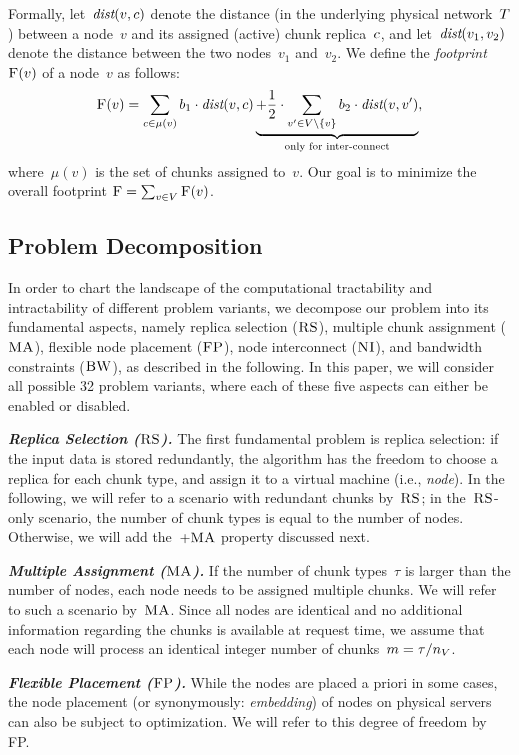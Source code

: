 Formally, let~$\emph{dist}(v,c)$ denote the distance (in the underlying physical network~$T$) between a node~$v$ and
its assigned (active) chunk replica~$c$, and let~$\emph{dist}(v_1,v_2)$ denote the distance between the two nodes~$v_1$ and~$v_2$.
We define the \emph{footprint}~$\textsc{F}(v)$ of a node~$v$ as follows:
$$
\textsc{F}(v) = \sum_{c\in \mu(v)} b_1 \cdot \emph{dist}(v,c) \underbrace{+ \frac{1}{2} \cdot \sum_{v' \in V\setminus\{v\}} b_2 \cdot \emph{dist}(v,v')}_{\text{only for inter-connect}},
$$
 where~$\mu(v)$ is the set of chunks assigned to~$v$. Our goal is to minimize the overall footprint
$\textsc{F}=\sum_{v\in V} \textsc{F}(v)$.

\subsection{Problem Decomposition}

In order to chart the landscape of the computational tractability and intractability of different
problem variants, we decompose our problem into its fundamental aspects, namely replica selection
($\textsc{RS}$), multiple chunk assignment ($\textsc{MA}$), flexible node placement ($\textsc{FP}$), node interconnect ($\textsc{NI}$),
and bandwidth constraints ($\textsc{BW}$), as described in the following. 
In this paper, we will consider all possible 32 problem variants, where each of these five aspects
can either be enabled or disabled. 

\textbf{\emph{Replica Selection ($\textsc{RS}$).}} The first fundamental problem is replica selection:
if the input data is stored redundantly, the algorithm has the freedom to choose a replica
for each chunk type, and assign it to a virtual machine (i.e., \emph{node}).
In the following, we will refer to a scenario
with redundant chunks by~$\textsc{RS}$; in the~$\textsc{RS}$-only scenario, the number of chunk types
is equal to the number of nodes. Otherwise, we will add the~$+\textsc{MA}$ property discussed next.

\textbf{\emph{Multiple Assignment ($\textsc{MA}$).}}
If the number of chunk types~$\tau$ is larger than the number of nodes,
each node needs to be assigned multiple chunks. We will refer to such a scenario by~$\textsc{MA}$. 
Since all nodes are identical and no additional information regarding the chunks is available at request time, we assume that each node will process an identical integer number of chunks~$m = \tau / n_V$. 


\textbf{\emph{Flexible Placement ($\textsc{FP}$).}} %
While the nodes are placed a priori in some cases, the node placement (or
synonymously: \emph{embedding}) of nodes on physical servers can also be
subject to optimization. We will refer to this degree of freedom by FP.

